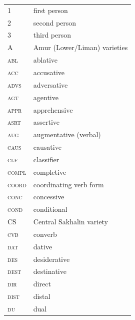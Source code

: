 \documentclass[output=paper,colorlinks,citecolor=brown]{langscibook}
\begin{document}
\begin{tabularx}{.45\textwidth}{lQ}
1 & first person\\
2 & second person\\
3 & third person\\
A & Amur (Lower/Liman) varieties\\
\scshape abl & ablative\\
\scshape acc & accusative\\
\scshape advs & adversative\\
\scshape agt & agentive \\
\scshape appr & apprehensive\\
\scshape asrt & assertive\\
\scshape aug & augmentative (verbal)\\
\scshape caus & causative\\
\scshape clf &classifier\\
\scshape compl & completive\\
\scshape coord  & coordinating verb form\\
\scshape conc  & concessive  \\
\scshape cond  & conditional  \\
CS & Central Sakhalin variety\\
\scshape cvb  &  converb \\
\scshape dat  & dative \\
\scshape des  & desiderative \\
\scshape dest  & destinative \\
\scshape dir & direct \\
\scshape dist  & distal  \\
\scshape du  & dual\\
\end{tabularx}
\end{document}
